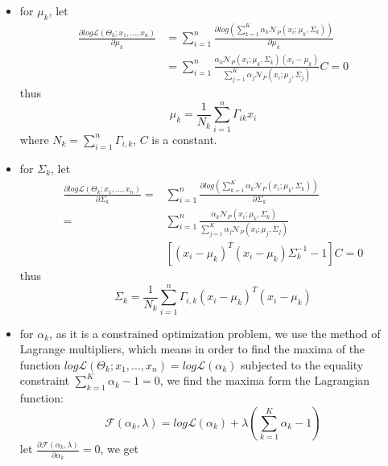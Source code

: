 \documentclass[12pt,a4paper]{article}
\begin{document}
\begin{itemize}
    \item for $\mu_k$, let
\begin{equation}
    \begin{aligned}
    \frac{\partial log  \mathcal{L}(\Theta_k; x_1,...,x_n)}{\partial \mu_k} &= \sum_{i = 1}^n \frac{\partial log (\sum_{k = 1}^K \alpha_k\mathcal{N}_P(x_i;\mu_k,\Sigma_k))}{\partial \mu_k}
    \\&=\sum_{i = 1}^n \frac{\alpha_k\mathcal{N}_P(x_i;\mu_k,\Sigma_k)(x_i - \mu_k)}{\sum_{j = 1}^K \alpha_j\mathcal{N}_P(x_i;\mu_j,\Sigma_j)} C=0
\end{aligned}
\end{equation}    
thus
\begin{equation}\label{eq:mu}
    \mu_k = \frac{1}{N_k}\sum_{i = 1}^n \Gamma_{ik} x_i 
\end{equation}
where $N_k = \sum_{i = 1}^n \Gamma _{i,k} $, $C$ is a constant.
\item for $\Sigma_k$, let
\begin{equation}
    \begin{aligned}
    \frac{\partial log  \mathcal{L}(\Theta_k; x_1,...,x_n)}{\partial \Sigma_k} =& \sum_{i = 1}^n \frac{\partial log (\sum_{k = 1}^K \alpha_k\mathcal{N}_P(x_i;\mu_k,\Sigma_k))}{\partial \Sigma_k}
    \\=&\sum_{i = 1}^n \frac{\alpha_k\mathcal{N}_P(x_i;\mu_k,\Sigma_k)}{\sum_{j = 1}^K \alpha_j\mathcal{N}_P(x_i;\mu_j,\Sigma_j)} \\&[(x_i -\mu_k)^T(x_i -\mu_k)\Sigma_k^{-1} -1] C=0
\end{aligned}
\end{equation}
thus
\begin{equation}\label{eq:sigma}
    \Sigma_k=\frac{1}{N_k}\sum_{i = 1}^n \Gamma _{i,k} (x_i -\mu_k)^T(x_i -\mu_k)
\end{equation}
\item for $\alpha_k$, as it is a constrained optimization problem, we use the method of Lagrange multipliers, which means in order to find the maxima of the function $log \mathcal{L}(\Theta_k; x_1,...,x_n) = log \mathcal{L}(\alpha_k)$ subjected to the equality constraint $\sum_{k=1}^K \alpha _k - 1 = 0$, we find the maxima form the Lagrangian function: 
\begin{equation}
   \mathcal{F}(\alpha_k, \lambda) =  log \mathcal{L}(\alpha_k) + \lambda(\sum_{k=1}^K \alpha _k - 1)
\end{equation}
let $\frac{\partial \mathcal{F}(\alpha_k, \lambda) }{ \partial \alpha_k } = 0$, we get

\end{itemize}
\end{document}
